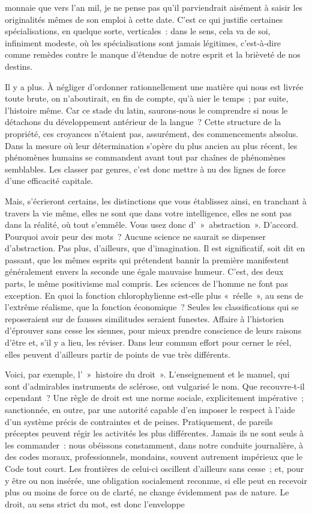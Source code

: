 \documentclass[french,twoside]{book} %
\begin{document}
\label{p74} monnaie que vers l’an mil, je ne pense pas qu’il parviendrait aisément à saisir les originalités mêmes de son emploi à cette date. C’est ce qui justifie certaines spécialisations, en quelque sorte, verticales : dans le sens, cela va de soi, infiniment modeste, où les spécialisations sont jamais légitimes, c’est‑à‑dire comme remèdes contre le manque d’étendue de notre esprit et la brièveté de nos destins.\par
Il y a plus. À négliger d’ordonner rationnellement une matière qui nous est livrée toute brute, on n’aboutirait, en fin de compte, qu’à nier le temps ; par suite, l’histoire même. Car ce stade du latin, saurons‑nous le comprendre si nous le détachons du développement antérieur de la langue ? Cette structure de la propriété, ces croyances n’étaient pas, assurément, des commencements absolus. Dans la mesure où leur détermi­nation s’opère du plus ancien au plus récent, les phénomènes humains se com­mandent avant tout par chaînes de phénomènes semblables. Les classer par genres, c’est donc mettre à nu des lignes de force d’une efficacité capitale.\par
Mais, s’écrieront certains, les distinctions que vous établissez ainsi, en tranchant à travers la vie même, elles ne sont que dans votre intel­ligence, elles ne sont pas dans la réalité, où tout s’emmêle. Vous usez donc d’ » abstraction ». D’accord. Pourquoi avoir peur des mots ? Aucune science ne saurait se dispenser d’abstraction. Pas plus, d’ailleurs, que d’imagination. Il est significatif, soit dit en passant, que les mêmes esprits qui prétendent bannir la première manifestent généralement envers la seconde une égale mauvaise humeur. C’est, des deux parts, le même positivisme mal compris. Les sciences de l’homme ne font pas exception. En quoi la fonction chlorophylienne est‑elle plus « réelle », au sens de l’extrême réalisme, que la fonction économique ? Seules les classifications qui se reposeraient sur de fausses similitudes seraient funestes. Affaire à l’historien d’éprouver sans cesse les siennes, pour mieux prendre cons­cience de leurs raisons d’être et, s’il y a lieu, les réviser. Dans leur com­mun effort pour cerner le réel, elles peuvent d’ailleurs partir de points de vue très différents.\par
Voici, par exemple, l’ » histoire du droit ». L’enseignement et le manuel, qui sont d’admirables instruments de sclérose, ont vulgarisé le nom. Que recouvre‑t‑il cependant ? Une règle de droit est une norme sociale, expli­citement impérative ; sanctionnée, en outre, par une autorité capable d’en imposer le respect à l’aide d’un système précis de contraintes et de peines. Pratiquement, de pareils préceptes peuvent régir les activités les plus différentes. Jamais ils ne sont seuls à les commander : nous obéis­sons constamment, dans notre conduite journalière, à des codes moraux, professionnels, mondains, souvent autrement impérieux que le Code tout court. Les frontières de celui-ci oscillent d’ailleurs sans cesse ; et, pour y être ou non insérée, une obligation socialement reconnue, si elle peut en recevoir plus ou moins de force ou de clarté, ne change évidemment pas de nature. Le droit, au sens strict du mot, est donc l’enveloppe  
\end{document}
